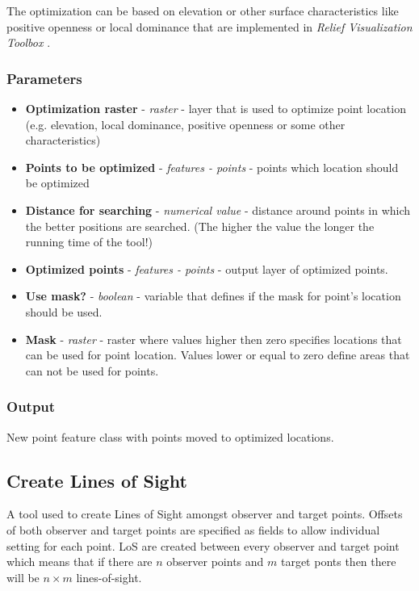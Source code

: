 \documentclass[]{article}
\begin{document}
The optimization can be based on elevation or other surface characteristics like positive openness or local dominance that are implemented in \textit{Relief Visualization Toolbox} \citep{Kokalj2016}.

\subsubsection{Parameters}
\begin{itemize}
	\item \textbf{Optimization raster} - \textit{raster} - layer that is used to optimize point location (e.g. elevation, local dominance, positive openness or some other characteristics)
	\item \textbf{Points to be optimized} - \textit{features - points} - points which location should be optimized
	\item \textbf{Distance for searching} - \textit{numerical value} - distance around points in which the better positions are searched. (The higher the value the longer the running time of the tool!)
	\item \textbf{Optimized points} - \textit{features - points} - output layer of optimized points.
	\item \textbf{Use mask?} - \textit{boolean} - variable that defines if the mask for point's location should be used.
	\item \textbf{Mask} - \textit{raster} - raster where values higher then zero specifies locations that can be used for point location. Values lower or equal to zero define areas that can not be used for points.
\end{itemize}

\subsubsection{Output}

New point feature class with points moved to optimized locations.

\subsection{Create Lines of Sight}
\label{Sec:createLoS}
A tool used to create Lines of Sight amongst observer and target points. Offsets of both observer and target points are specified as fields to allow individual setting for each point. LoS are created between every observer and target point which means that if there are $n$ observer points and $m$ target ponts then there will be $n \times m$ lines-of-sight.
\end{document}
